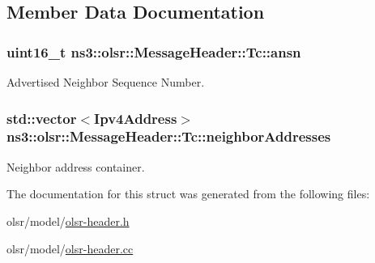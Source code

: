 \subsection{Member Data Documentation}
\subsubsection[{\texorpdfstring{ansn}{ansn}}]{\setlength{\rightskip}{0pt plus 5cm}uint16\+\_\+t ns3\+::olsr\+::\+Message\+Header\+::\+Tc\+::ansn}\hypertarget{structns3_1_1olsr_1_1MessageHeader_1_1Tc_a0f74e45f855b1b500fb950336ef4aa63}{}\label{structns3_1_1olsr_1_1MessageHeader_1_1Tc_a0f74e45f855b1b500fb950336ef4aa63}


Advertised Neighbor Sequence Number. 

\subsubsection[{\texorpdfstring{neighbor\+Addresses}{neighborAddresses}}]{\setlength{\rightskip}{0pt plus 5cm}std\+::vector$<${\bf Ipv4\+Address}$>$ ns3\+::olsr\+::\+Message\+Header\+::\+Tc\+::neighbor\+Addresses}\hypertarget{structns3_1_1olsr_1_1MessageHeader_1_1Tc_a236424f611929db7d7f154f8c31c970e}{}\label{structns3_1_1olsr_1_1MessageHeader_1_1Tc_a236424f611929db7d7f154f8c31c970e}


Neighbor address container. 



The documentation for this struct was generated from the following files\+:\begin{DoxyCompactItemize}
\item 
olsr/model/\hyperlink{olsr-header_8h}{olsr-\/header.\+h}\item 
olsr/model/\hyperlink{olsr-header_8cc}{olsr-\/header.\+cc}\end{DoxyCompactItemize}
